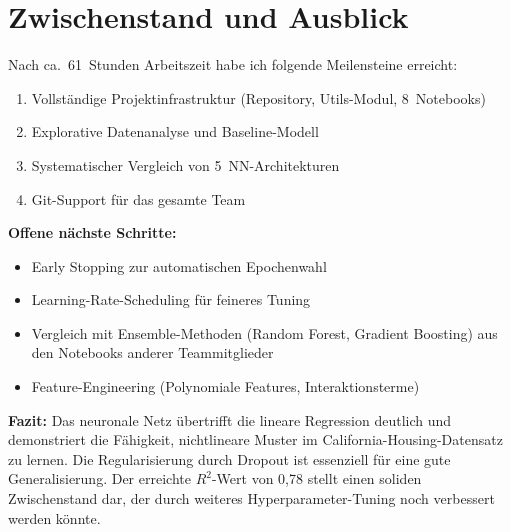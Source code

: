 \documentclass[9pt,a4paper,twocolumn,twoside]{tau-class/tau}
\begin{document}

\section{Zwischenstand und Ausblick}

Nach ca.\ 61~Stunden Arbeitszeit habe ich folgende Meilensteine erreicht:

\begin{enumerate}
    \item Vollst\"andige Projektinfrastruktur (Repository, Utils-Modul, 8~Notebooks)
    \item Explorative Datenanalyse und Baseline-Modell
    \item Systematischer Vergleich von 5~NN-Architekturen
    \item Git-Support f\"ur das gesamte Team
\end{enumerate}

\textbf{Offene n\"achste Schritte:}
\begin{itemize}
    \item Early Stopping zur automatischen Epochenwahl
    \item Learning-Rate-Scheduling f\"ur feineres Tuning
    \item Vergleich mit Ensemble-Methoden (Random Forest, Gradient Boosting) aus den Notebooks anderer Teammitglieder
    \item Feature-Engineering (Polynomiale Features, Interaktionsterme)
\end{itemize}

\textbf{Fazit:} Das neuronale Netz \"ubertrifft die lineare Regression deutlich und demonstriert die F\"ahigkeit, nichtlineare Muster im California-Housing-Datensatz zu lernen. Die Regularisierung durch Dropout ist essenziell f\"ur eine gute Generalisierung. Der erreichte $R^2$-Wert von 0{,}78 stellt einen soliden Zwischenstand dar, der durch weiteres Hyperparameter-Tuning noch verbessert werden k\"onnte.


\printbibliography

\end{document}
